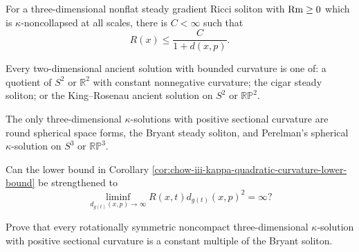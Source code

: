 \begin{corollary}
\label{cor:chow-iii-3d-steady-soliton-curvature-upper-bound}

For a three-dimensional nonflat steady gradient Ricci soliton with
$\operatorname{Rm}\ge0$ which is $\kappa$-noncollapsed at all scales, there is $C<\infty$
such that
\[
 R(x)\le\frac C{1+d(x,p)}.
\]
\end{corollary}

\begin{claim}
\label{conj:chow-iii-2d-ancient-classification}
Every two-dimensional ancient solution with bounded curvature is one of:
a quotient of $S^2$ or $\mathbb R^2$ with constant nonnegative curvature;
the cigar steady soliton; or the King--Rosenau ancient solution on $S^2$ or
$\mathbb{RP}^2$.
\end{claim}

\begin{claim}
\label{conj:chow-iii-3d-positive-kappa-classification}
The only three-dimensional $\kappa$-solutions with positive sectional
curvature are round spherical space forms, the Bryant steady soliton, and
Perelman's spherical $\kappa$-solution on $S^3$ or $\mathbb{RP}^3$.
\end{claim}

\begin{example}
\label{prob:chow-iii-kappa-derivatives-infinite-ascr}
Can the lower bound in Corollary
\ref{cor:chow-iii-kappa-quadratic-curvature-lower-bound} be strengthened to
\[
 \liminf_{d_{g(t)}(x,p)\to\infty}R(x,t)d_{g(t)}(x,p)^2=\infty?
\]
\end{example}

\begin{example}
\label{prob:chow-iii-rotational-kappa-bryant}
Prove that every rotationally symmetric noncompact three-dimensional
$\kappa$-solution with positive sectional curvature is a constant multiple
of the Bryant soliton.
\end{example}
